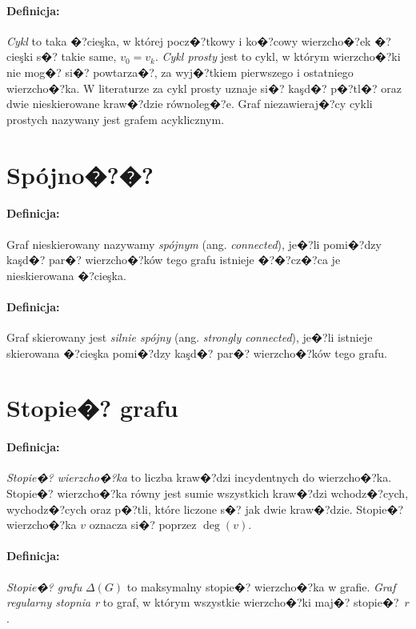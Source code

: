 \documentclass[12pt,a4paper]{mwrep}
\begin{document}
\paragraph{Definicja:} \emph{Cykl} to taka �?cieşka, w której pocz�?tkowy 
i ko�?cowy wierzcho�?ek �?cieşki s�? takie same, $v_0 = v_k$.
\emph{Cykl prosty} jest to cykl, w którym wierzcho�?ki nie mog�? si�? powtarza�?,
za wyj�?tkiem pierwszego i ostatniego wierzcho�?ka. 
W literaturze za cykl prosty uznaje si�? kaşd�? 
p�?tl�? oraz dwie nieskierowane kraw�?dzie równoleg�?e. 
Graf niezawieraj�?cy cykli prostych nazywany jest grafem acyklicznym.

\section{Spójno�?�?}

\paragraph{Definicja:} Graf nieskierowany nazywamy \emph{spójnym} 
(ang. \emph{connected}), je�?li pomi�?dzy
kaşd�? par�? wierzcho�?ków tego grafu istnieje �?�?cz�?ca je nieskierowana �?cieşka. 

\paragraph{Definicja:} Graf skierowany jest \emph{silnie spójny} 
(ang.  \emph{strongly connected}), je�?li istnieje skierowana �?cieşka pomi�?dzy 
kaşd�? par�? wierzcho�?ków tego grafu.

\section{Stopie�? grafu}

\paragraph{Definicja:} \emph{Stopie�? wierzcho�?ka} to liczba kraw�?dzi 
incydentnych do wierzcho�?ka. Stopie�? wierzcho�?ka równy jest sumie 
wszystkich kraw�?dzi wchodz�?cych, wychodz�?cych oraz p�?tli, 
które liczone s�? jak dwie kraw�?dzie. 
Stopie�? wierzcho�?ka $v$ oznacza si�? poprzez $\deg(v)$.

\paragraph{Definicja:} \emph{Stopie�? grafu} $\Delta(G)$ to maksymalny 
stopie�? wierzcho�?ka w grafie.
\emph{Graf regularny stopnia r} to graf, w którym wszystkie wierzcho�?ki 
maj�? stopie�?~$r$.
\end{document}
